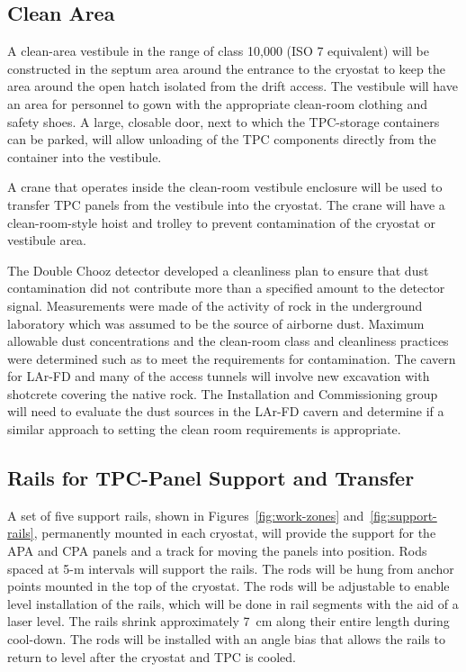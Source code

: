 \subsection{Clean Area}
A clean-area vestibule in the range of class 10,000 (ISO 7 equivalent) will be constructed in the septum area around the entrance to the cryostat to keep the area around the open hatch isolated from the drift access. The vestibule will have an area for personnel to gown with the appropriate clean-room clothing and safety shoes. A large, closable door, next to which the TPC-storage containers can be parked, will allow unloading of the TPC components directly from the container into the vestibule. 

A crane that operates inside the clean-room vestibule enclosure will be used to transfer 
TPC panels from the vestibule into the cryostat. The crane will have a clean-room-style hoist and trolley to prevent contamination of the cryostat or vestibule area. 

The Double Chooz detector developed a cleanliness plan to ensure that dust contamination did not contribute more than a specified amount to the detector signal. Measurements were made of the activity of rock in the underground laboratory which was assumed to be the source of airborne dust. Maximum allowable dust concentrations  
and the clean-room class and cleanliness practices were determined such as to meet the requirements for contamination. The cavern for LAr-FD and many of the access tunnels will involve new excavation with shotcrete 
covering the native rock.  
The Installation and Commissioning group will need to evaluate the dust sources in the 
LAr-FD cavern and determine if a similar approach to setting the clean room requirements is appropriate.


\subsection{Rails for TPC-Panel 
Support and Transfer}

A set of five support rails, shown in Figures~\ref{fig:work-zones} and~\ref{fig:support-rails}, permanently mounted  in each cryostat, will provide the support for the APA and CPA panels and a track for moving the panels into position. Rods spaced at 5-m intervals will support the rails. The rods will be hung from anchor points mounted in the top of the cryostat.  The rods will be adjustable to enable level installation of the rails, 
which will be done in rail segments with the aid of a laser level.
The rails shrink approximately 7~cm along their entire length during cool-down. The rods will be installed with an angle bias that allows the rails to return to level after the cryostat and TPC is cooled.

